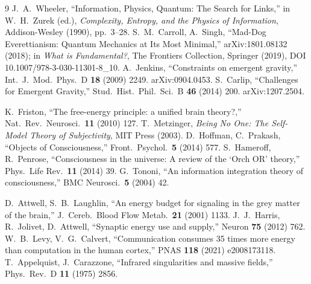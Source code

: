 \documentclass[12pt,a4paper,twoside]{article}
\theoremstyle{plain}
\theoremstyle{definition}
\theoremstyle{remark}
\begin{document}
\begin{thebibliography}{9}
J.~A.~Wheeler, ``Information, Physics, Quantum: The Search for Links,'' in W.~H.~Zurek (ed.), \emph{Complexity, Entropy, and the Physics of Information}, Addison-Wesley (1990), pp.~3--28.
S.~M.~Carroll, A.~Singh, ``Mad-Dog Everettianism: Quantum Mechanics at Its Most Minimal,'' arXiv:1801.08132 (2018); in \emph{What is Fundamental?}, The Frontiers Collection, Springer (2019), DOI 10.1007/978-3-030-11301-8\_10.
A.~Jenkins, ``Constraints on emergent gravity,'' Int.\ J.\ Mod.\ Phys.\ D \textbf{18} (2009) 2249. arXiv:0904.0453.
S.~Carlip, ``Challenges for Emergent Gravity,'' Stud.\ Hist.\ Phil.\ Sci.\ B \textbf{46} (2014) 200. arXiv:1207.2504.

K.~Friston, ``The free-energy principle: a unified brain theory?,'' Nat.\ Rev.\ Neurosci.\ \textbf{11} (2010) 127.
T.~Metzinger, \textit{Being No One: The Self-Model Theory of Subjectivity}, MIT Press (2003).
D.~Hoffman, C.~Prakash, ``Objects of Consciousness,'' Front.\ Psychol.\ \textbf{5} (2014) 577.
S.~Hameroff, R.~Penrose, ``Consciousness in the universe: A review of the `Orch OR' theory,'' Phys.\ Life Rev.\ \textbf{11} (2014) 39.
G.~Tononi, ``An information integration theory of consciousness,'' BMC Neurosci.\ \textbf{5} (2004) 42.

D.~Attwell, S.~B.~Laughlin, ``An energy budget for signaling in the grey matter of the brain,'' J.\ Cereb.\ Blood Flow Metab.\ \textbf{21} (2001) 1133.
J.~J.~Harris, R.~Jolivet, D.~Attwell, ``Synaptic energy use and supply,'' Neuron \textbf{75} (2012) 762.
W.~B.~Levy, V.~G.~Calvert, ``Communication consumes 35 times more energy than computation in the human cortex,'' PNAS \textbf{118} (2021) e2008173118.
T.~Appelquist, J.~Carazzone, ``Infrared singularities and massive fields,'' Phys.\ Rev.\ D \textbf{11} (1975) 2856.


\end{thebibliography}
\end{document}
